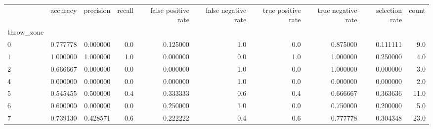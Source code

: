 \begin{tabular}{lrrrrrrrrr}
\toprule
{} &  accuracy &  precision &  recall &  false positive rate &  false negative rate &  true positive rate &  true negative rate &  selection rate &  count \\
throw\_zone &           &            &         &                      &                      &                     &                     &                 &        \\
\midrule
0          &  0.777778 &   0.000000 &     0.0 &             0.125000 &                  1.0 &                 0.0 &            0.875000 &        0.111111 &    9.0 \\
1          &  1.000000 &   1.000000 &     1.0 &             0.000000 &                  0.0 &                 1.0 &            1.000000 &        0.250000 &    4.0 \\
2          &  0.666667 &   0.000000 &     0.0 &             0.000000 &                  1.0 &                 0.0 &            1.000000 &        0.000000 &    3.0 \\
4          &  0.000000 &   0.000000 &     0.0 &             0.000000 &                  1.0 &                 0.0 &            0.000000 &        0.000000 &    2.0 \\
5          &  0.545455 &   0.500000 &     0.4 &             0.333333 &                  0.6 &                 0.4 &            0.666667 &        0.363636 &   11.0 \\
6          &  0.600000 &   0.000000 &     0.0 &             0.250000 &                  1.0 &                 0.0 &            0.750000 &        0.200000 &    5.0 \\
7          &  0.739130 &   0.428571 &     0.6 &             0.222222 &                  0.4 &                 0.6 &            0.777778 &        0.304348 &   23.0 \\
\bottomrule
\end{tabular}
